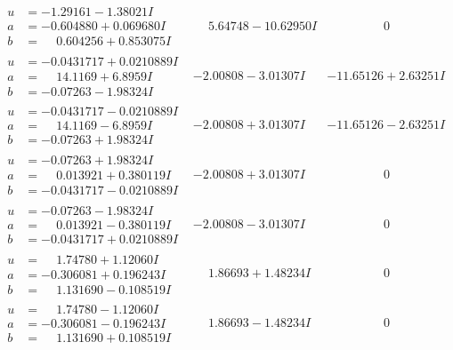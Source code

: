 \documentclass[1p]{elsarticle_modified}
\theoremstyle{definition}
\begin{document}
$$\begin{array}{c|c|c}
\begin{aligned}
u &= -1.29161 - 1.38021 I \\
a &= -0.604880 + 0.069680 I \\
b &= \phantom{-}0.604256 + 0.853075 I\end{aligned}
 & \phantom{-}5.64748 - 10.62950 I & \phantom{-0.000000 } 0 \\ \hline\begin{aligned}
u &= -0.0431717 + 0.0210889 I \\
a &= \phantom{-}14.1169 + 6.8959 I \\
b &= -0.07263 - 1.98324 I\end{aligned}
 & -2.00808 - 3.01307 I & -11.65126 + 2.63251 I \\ \hline\begin{aligned}
u &= -0.0431717 - 0.0210889 I \\
a &= \phantom{-}14.1169 - 6.8959 I \\
b &= -0.07263 + 1.98324 I\end{aligned}
 & -2.00808 + 3.01307 I & -11.65126 - 2.63251 I \\ \hline\begin{aligned}
u &= -0.07263 + 1.98324 I \\
a &= \phantom{-}0.013921 + 0.380119 I \\
b &= -0.0431717 - 0.0210889 I\end{aligned}
 & -2.00808 + 3.01307 I & \phantom{-0.000000 } 0 \\ \hline\begin{aligned}
u &= -0.07263 - 1.98324 I \\
a &= \phantom{-}0.013921 - 0.380119 I \\
b &= -0.0431717 + 0.0210889 I\end{aligned}
 & -2.00808 - 3.01307 I & \phantom{-0.000000 } 0 \\ \hline\begin{aligned}
u &= \phantom{-}1.74780 + 1.12060 I \\
a &= -0.306081 + 0.196243 I \\
b &= \phantom{-}1.131690 - 0.108519 I\end{aligned}
 & \phantom{-}1.86693 + 1.48234 I & \phantom{-0.000000 } 0 \\ \hline\begin{aligned}
u &= \phantom{-}1.74780 - 1.12060 I \\
a &= -0.306081 - 0.196243 I \\
b &= \phantom{-}1.131690 + 0.108519 I\end{aligned}
 & \phantom{-}1.86693 - 1.48234 I & \phantom{-0.000000 } 0\\

\end{array}$$
\end{document}
